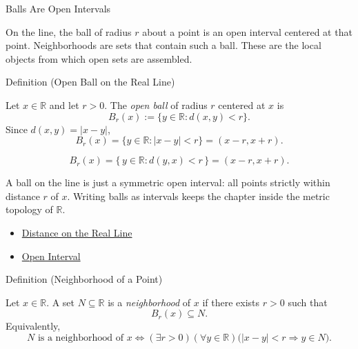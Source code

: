 \label{sec:neighborhoods-and-balls}

\begin{topicbox}{Balls Are Open Intervals}
\begin{exposition}
On the line, the ball of radius $r$ about a point is an open interval centered at that point. Neighborhoods are sets that contain such a ball. These are the local objects from which open sets are assembled.
\end{exposition}
\end{topicbox}
\begin{definitionbox}{Definition (Open Ball on the Real Line)}
\begin{definition}
\label{def:open-ball}
Let $x\in\mathbb{R}$ and let $r>0$.  The \emph{open ball} of radius $r$
centered at $x$ is
\[
  B_r(x):=\{y\in\mathbb{R}:d(x,y)<r\}.
\]
Since $d(x,y)=|x-y|$,
\[
  B_r(x)
  =
  \{y\in\mathbb{R}:|x-y|<r\}
  =
  (x-r,x+r).
\]
\end{definition}
\end{definitionbox}
\begin{remark*}
\[
B_{r}(x)=\{\,y\in\mathbb{R} : d(y,x)<r\,\}=(x-r,x+r).
\]
\end{remark*}
\begin{remark*}[Interpretation]
A ball on the line is just a symmetric open interval: all points strictly within distance $r$ of $x$. Writing balls as intervals keeps the chapter inside the metric topology of $\mathbb{R}$.
\end{remark*}
\begin{dependencies}
\begin{itemize}
  \item \hyperref[def:distance-on-real-line]{Distance on the Real Line}
  \item \hyperref[def:open-interval]{Open Interval}
\end{itemize}
\end{dependencies}
\begin{definitionbox}{Definition (Neighborhood of a Point)}
\begin{definition}
\label{def:neighborhood-of-point}
Let $x\in\mathbb{R}$.  A set $N\subseteq\mathbb{R}$ is a
\emph{neighborhood} of $x$ if there exists $r>0$ such that
\[
  B_r(x)\subseteq N.
\]
Equivalently,
\[
  N\text{ is a neighborhood of }x
  \Longleftrightarrow
  (\exists r>0)(\forall y\in\mathbb{R})
  \bigl(|x-y|<r\Longrightarrow y\in N\bigr).
\]
\end{definition}
\end{definitionbox}
